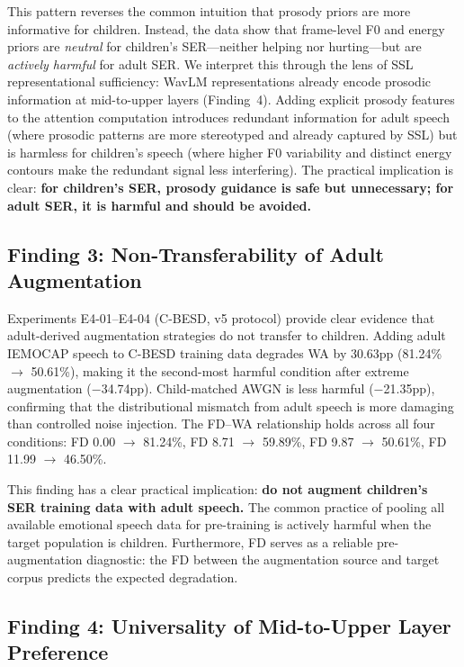 \noindent This pattern reverses the common intuition that prosody priors are
more informative for children. Instead, the data show that frame-level F0 and
energy priors are \emph{neutral} for children's SER---neither helping nor
hurting---but are \emph{actively harmful} for adult SER. We interpret this
through the lens of SSL representational sufficiency: WavLM representations
already encode prosodic information at mid-to-upper layers (Finding~4).
Adding explicit prosody features to the attention computation introduces
redundant information for adult speech (where prosodic patterns are more
stereotyped and already captured by SSL) but is harmless for children's speech
(where higher F0 variability and distinct energy contours make the redundant
signal less interfering). The practical implication is clear: \textbf{for
children's SER, prosody guidance is safe but unnecessary; for adult SER, it is
harmful and should be avoided.}

\subsection{Finding 3: Non-Transferability of Adult Augmentation}

Experiments E4-01--E4-04 (C-BESD, v5 protocol) provide clear evidence that
adult-derived augmentation strategies do not transfer to children. Adding adult
IEMOCAP speech to C-BESD training data degrades WA by 30.63pp
(81.24\% $\rightarrow$ 50.61\%), making it the second-most harmful condition
after extreme augmentation ($-$34.74pp). Child-matched AWGN is less harmful
($-$21.35pp), confirming that the distributional mismatch from adult speech is
more damaging than controlled noise injection. The FD--WA relationship holds
across all four conditions: FD 0.00 $\rightarrow$ 81.24\%, FD 8.71
$\rightarrow$ 59.89\%, FD 9.87 $\rightarrow$ 50.61\%, FD 11.99 $\rightarrow$
46.50\%.

This finding has a clear practical implication: \textbf{do not augment
children's SER training data with adult speech.} The common practice of pooling
all available emotional speech data for pre-training is actively harmful when
the target population is children. Furthermore, FD serves as a reliable
pre-augmentation diagnostic: the FD between the augmentation source and target
corpus predicts the expected degradation.

\subsection{Finding 4: Universality of Mid-to-Upper Layer Preference}

